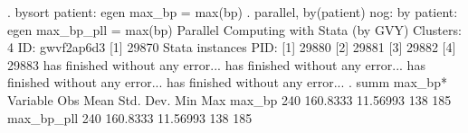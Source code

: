. bysort patient: egen max_bp = max(bp)
{\smallskip}
. parallel, by(patient) nog: by patient: egen max_bp_pll = max(bp)
Parallel Computing with Stata (by GVY)
Clusters: 4
ID: gwvf2ap6d3
{\smallskip}
[1] 29870
Stata instances PID:
[1] 29880
[2] 29881
[3] 29882
[4] 29883
{} has finished without any error...
{} has finished without any error...
{} has finished without any error...
{} has finished without any error...
{\smallskip}
. summ max_bp*
{\smallskip}
    Variable {\VBAR}       Obs        Mean    Std. Dev.       Min        Max
      max_bp {\VBAR}       240    160.8333    11.56993        138        185
  max_bp_pll {\VBAR}       240    160.8333    11.56993        138        185
{\smallskip}
